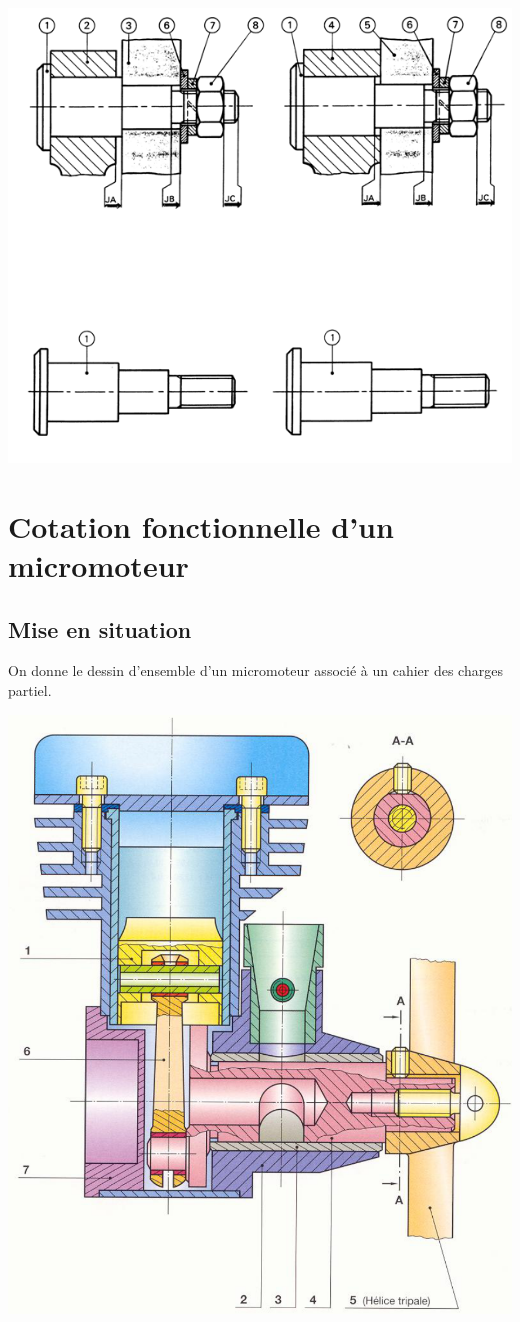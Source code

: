 \documentclass[11pt,oneside]{article}
\begin{document}
\begin{center}
\includegraphics[width=.8\textwidth]{png/comparee}
\end{center}


\section{Cotation fonctionnelle d'un micromoteur}

\subsection{Mise en situation}
On donne le dessin d'ensemble d'un micromoteur associé à un cahier des charges partiel.

\begin{center}
\includegraphics[width=.8\textwidth]{png/MicroMoteur}
\end{center}
\end{document}
